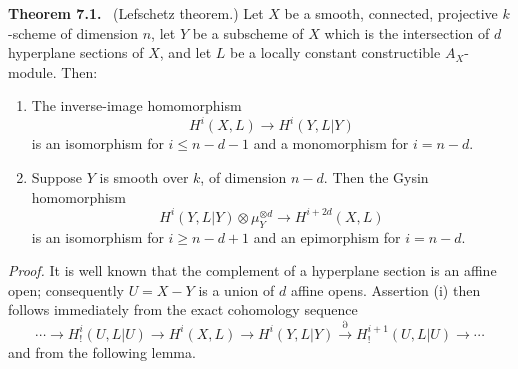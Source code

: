\documentclass[11pt]{article}
\newenvironment{statement}[1]{\par\medskip\noindent\textbf{#1.}\ }{\par\medskip}
\begin{document}
\begin{statement}{Theorem 7.1}
(Lefschetz theorem.) Let $X$ be a smooth, connected, projective $k$-scheme of dimension $n$, let $Y$ be a subscheme of $X$ which is the intersection of $d$ hyperplane sections of $X$, and let $L$ be a locally constant constructible $A_X$-module. Then:
\begin{enumerate}[label=(\roman*)]
\item The inverse-image homomorphism
\[
H^i(X,L)\to H^i(Y,L|Y)
\]
is an isomorphism for $i\le n-d-1$ and a monomorphism for $i=n-d$.
\item Suppose $Y$ is smooth over $k$, of dimension $n-d$. Then the Gysin homomorphism
\[
H^i(Y,L|Y)\otimes\mu_Y^{\otimes d}\to H^{i+2d}(X,L)
\]
is an isomorphism for $i\ge n-d+1$ and an epimorphism for $i=n-d$.
\end{enumerate}
\end{statement}

\emph{Proof.} It is well known that the complement of a hyperplane section is an affine open; consequently $U=X-Y$ is a union of $d$ affine opens. Assertion (i) then follows immediately from the exact cohomology sequence
\[
\cdots\to H_!^i(U,L|U)\to H^i(X,L)\to H^i(Y,L|Y)
\xrightarrow{\partial} H_!^{i+1}(U,L|U)\to\cdots
\]
and from the following lemma.
\end{document}
